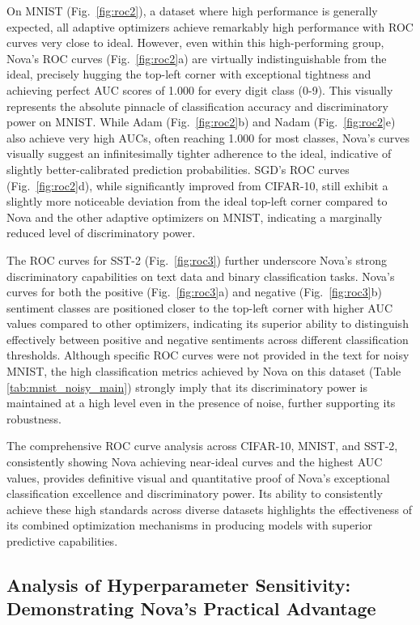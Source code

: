 \documentclass{article}
\begin{document}
On MNIST (Fig.~\ref{fig:roc2}), a dataset where high performance is generally expected, all adaptive optimizers achieve remarkably high performance with ROC curves very close to ideal. However, even within this high-performing group, Nova's ROC curves (Fig.~\ref{fig:roc2}a) are virtually indistinguishable from the ideal, precisely hugging the top-left corner with exceptional tightness and achieving perfect AUC scores of 1.000 for every digit class (0-9). This visually represents the absolute pinnacle of classification accuracy and discriminatory power on MNIST. While Adam (Fig.~\ref{fig:roc2}b) and Nadam (Fig.~\ref{fig:roc2}e) also achieve very high AUCs, often reaching 1.000 for most classes, Nova's curves visually suggest an infinitesimally tighter adherence to the ideal, indicative of slightly better-calibrated prediction probabilities. SGD's ROC curves (Fig.~\ref{fig:roc2}d), while significantly improved from CIFAR-10, still exhibit a slightly more noticeable deviation from the ideal top-left corner compared to Nova and the other adaptive optimizers on MNIST, indicating a marginally reduced level of discriminatory power.

The ROC curves for SST-2 (Fig.~\ref{fig:roc3}) further underscore Nova's strong discriminatory capabilities on text data and binary classification tasks. Nova's curves for both the positive (Fig.~\ref{fig:roc3}a) and negative (Fig.~\ref{fig:roc3}b) sentiment classes are positioned closer to the top-left corner with higher AUC values compared to other optimizers, indicating its superior ability to distinguish effectively between positive and negative sentiments across different classification thresholds. Although specific ROC curves were not provided in the text for noisy MNIST, the high classification metrics achieved by Nova on this dataset (Table \ref{tab:mnist_noisy_main}) strongly imply that its discriminatory power is maintained at a high level even in the presence of noise, further supporting its robustness.

The comprehensive ROC curve analysis across CIFAR-10, MNIST, and SST-2, consistently showing Nova achieving near-ideal curves and the highest AUC values, provides definitive visual and quantitative proof of Nova's exceptional classification excellence and discriminatory power. Its ability to consistently achieve these high standards across diverse datasets highlights the effectiveness of its combined optimization mechanisms in producing models with superior predictive capabilities.

\subsection{Analysis of Hyperparameter Sensitivity: Demonstrating Nova's Practical Advantage}
\end{document}
